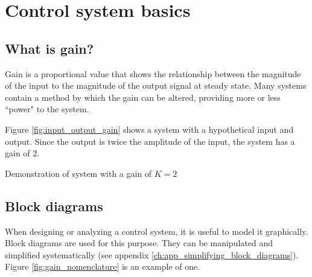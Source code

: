 
\chapter{Control system basics}

\section{What is gain?}

Gain is a proportional value that shows the relationship between the magnitude
of the input to the magnitude of the output signal at steady state. Many
\glspl{system} contain a method by which the gain can be altered, providing more
or less ``power" to the \gls{system}.

Figure \ref{fig:input_output_gain} shows a system with a hypothetical input and
output. Since the output is twice the amplitude of the input, the system has a
gain of $2$.

\begin{bookfigure}

  \caption{Demonstration of system with a gain of $K = 2$}
  \label{fig:input_output_gain}
\end{bookfigure}

\section{Block diagrams}

When designing or analyzing a control system, it is useful to model it
graphically. Block diagrams are used for this purpose. They can be manipulated
and simplified systematically (see appendix
\ref{ch:app_simplifying_block_diagrams}). Figure \ref{fig:gain_nomenclature} is
an example of one.

